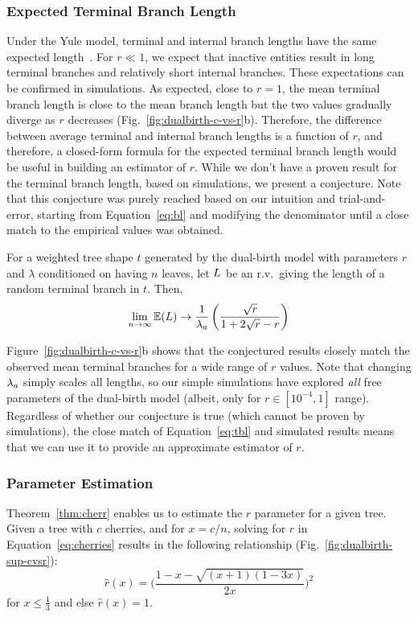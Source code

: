 \subsubsection{Expected Terminal Branch Length}
Under the Yule model, terminal and internal branch lengths have the same expected length~\cite{Mooers2012}. For $r\ll1$, we expect that inactive entities result in long terminal branches and relatively short internal branches. These expectations can be confirmed in simulations. As expected, close to $r=1$, the mean terminal branch length is close to the mean branch length but the two values gradually diverge as $r$ decreases (Fig.~\ref{fig:dualbirth-c-vs-r}b). Therefore, the difference between average terminal and internal branch lengths is a function of $r$, and therefore, a closed-form formula for the expected terminal branch length would be useful in building an estimator of $r$. While we don't have a proven result for the terminal branch length, based on simulations, we present a conjecture. Note that this conjecture was purely reached based on our intuition and trial-and-error, starting from Equation~\ref{eq:bl} and modifying the denominator until a close match to the empirical values was obtained.

\begin{conjecture}\label{thm:tbl}
For a weighted tree shape $t$ generated by the dual-birth model with parameters $r$ and $\lambda$ conditioned on having $n$ leaves, let $L$ be an r.v.\ giving the length of a random terminal branch in $t$. Then, 
\begin{align}\label{eq:tbl}
\lim_{n\to\infty}\mathbb{E}(L)\to\frac{1}{\lambda_a}\left(\frac{\sqrt{r}}{1+2\sqrt{r}-r}\right)
\end{align}
\end{conjecture}

Figure~\ref{fig:dualbirth-c-vs-r}b shows that the conjectured results closely match the observed mean terminal branches for a wide range of $r$ values. Note that changing $\lambda_a$ simply scales all lengths, so our simple simulations have explored \textit{all} free parameters of the dual-birth model (albeit, only for $r\in[10^{-4},1]$ range). Regardless of whether our conjecture is true (which cannot be proven by simulations), the close match of Equation~\ref{eq:tbl} and simulated results means that we can use it to provide an approximate estimator of $r$.

\subsubsection{Parameter Estimation}\label{sec:dualbirth-paramest}
Theorem~\ref{thm:cherr} enables us to estimate the $r$ parameter for a given tree. Given a tree with $c$ cherries, and for $x=c/n$, solving for $r$ in Equation~\ref{eq:cherries} results in the following relationship (Fig.~\ref{fig:dualbirth-sup-cvsr}):
\begin{equation}\label{eq:rforc}
\hat{r}(x)=\bigg(\frac{1-x-\sqrt{(x+1)(1-3x)}}{2x}\bigg)^2
\end{equation}
for $x\leq \frac{1}{3}$ and else $\hat{r}(x)=1$.


